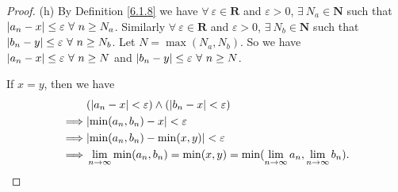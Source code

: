 \begin{proof}{(h)}
    By Definition \ref{6.1.8} we have \(\forall\ \varepsilon \in \mathbf{R}\) and \(\varepsilon > 0\), \(\exists\ N_a \in \mathbf{N}\) such that \(\abs*{a_n - x} \leq \varepsilon \ \forall\ n \geq N_a\).
    Similarly \(\forall\ \varepsilon \in \mathbf{R}\) and \(\varepsilon > 0\), \(\exists\ N_b \in \mathbf{N}\) such that \(\abs*{b_n - y} \leq \varepsilon \ \forall\ n \geq N_b\).
    Let \(N = \max(N_a, N_b)\).
    So we have \(\abs*{a_n - x} \leq \varepsilon \ \forall\ n \geq N\) and \(\abs*{b_n - y} \leq \varepsilon \ \forall\ n \geq N\).

    If \(x = y\), then we have
    \begin{align*}
                 & (\abs*{a_n - x} < \varepsilon) \land (\abs*{b_n - x} < \varepsilon)                                       \\
        \implies & \abs*{\min(a_n, b_n) - x} < \varepsilon                                                                   \\
        \implies & \abs*{\min(a_n, b_n) - \min(x, y)} < \varepsilon                                                          \\
        \implies & \lim_{n \to \infty} \min(a_n, b_n) = \min(x, y) = \min(\lim_{n \to \infty} a_n, \lim_{n \to \infty} b_n).
    \end{align*}


\end{proof}
